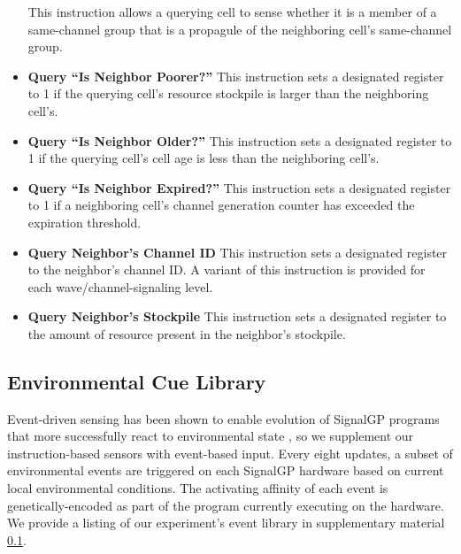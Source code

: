 \begin{itemize}
This instruction allows a querying cell to sense whether it is a member of a same-channel group that is a propagule of the neighboring cell's same-channel group.
\item \textbf{Query ``Is Neighbor Poorer?''}
This instruction sets a designated register to 1 if the querying cell's resource stockpile is larger than the neighboring cell's.
\item \textbf{Query ``Is Neighbor Older?''}
This instruction sets a designated register to 1 if the querying cell's cell age is less than the neighboring cell's.
\item \textbf{Query ``Is Neighbor Expired?''}
This instruction sets a designated register to 1 if a neighboring cell's channel generation counter has exceeded the expiration threshold.
\item \textbf{Query Neighbor's Channel ID}
This instruction sets a designated register to the neighbor's channel ID.
A variant of this instruction is provided for each wave/channel-signaling level.
\item \textbf{Query Neighbor's Stockpile}
This instruction sets a designated register to the amount of resource present in the neighbor's stockpile.
\end{itemize}

\subsection{Environmental Cue Library} \label{sup:environmental_cue_library}

Event-driven sensing has been shown to enable evolution of SignalGP programs that more successfully react to  environmental state \cite{lalejini2018evolving}, so we supplement our instruction-based sensors with event-based input.
Every eight updates, a subset of environmental events are triggered on each SignalGP hardware based on current local environmental conditions.
The activating affinity of each event is genetically-encoded as part of the program currently executing on the hardware.
We provide a listing of our experiment's event library in supplementary material \ref{sup:environmental_cue_library}.

